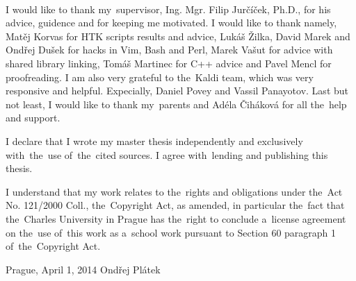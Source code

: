 \normalsize %

\ \\
\vspace{10mm}

\noindent I would like to thank my~supervisor, Ing. Mgr. Filip Jurčíček, Ph.D., for his advice, guidence and 
for keeping me motivated. 
I would like to thank namely, Matěj Korvas for HTK scripts results and advice, 
Lukáš Žilka, David Marek and Ondřej Dušek for hacks in Vim, Bash and Perl, 
Marek Vašut for advice with shared library linking, Tomáš Martinec for C++ advice
and Pavel Mencl for proofreading.
I am also very grateful to the~Kaldi team, which was very responsive and helpful.
Expecially, Daniel Povey and  Vassil Panayotov. 
Last but not least, I would like to thank my~parents and Adéla Čiháková for all the~help and support.


\vspace{\fill} %
\medskip\noindent
I declare that I wrote my master thesis independently and exclusively with~the~use of~the~cited sources. I agree with~lending and publishing this thesis.

I understand that my work relates to the~rights and obligations under the~Act No. 121/2000 Coll., the~Copyright Act, as amended, in particular the~fact that the~Charles University in Prague has the~right to conclude a~license agreement on the~use of~this work as a~school work pursuant to Section 60 paragraph 1 of~the~Copyright Act.

\noindent Prague, April 1, 2014 \hspace{\fill}Ondřej Plátek 


\newpage

\ \\
\vspace{10mm}
\ \\

